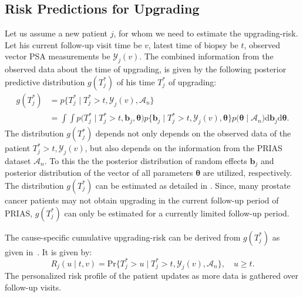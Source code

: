 \begin{subappendices}
\section{Risk Predictions for Upgrading}
\label{c5:appendix:validation_res}
Let us assume a new patient $j$, for whom we need to estimate the upgrading-risk. Let his current follow-up visit time be $v$, latest time of biopsy be $t$, observed vector PSA measurements be $\mathcal{Y}_{j}(v)$. The combined information from the observed data about the time of upgrading, is given by the following posterior predictive distribution $g(T^*_j)$ of his time $T^*_j$ of upgrading:
\begin{equation*}
\label{c5:eq:post_pred_dist}
\begin{aligned}
g(T^*_j) &= p\big\{T^*_j \mid T^*_j > t, \mathcal{Y}_{j}(v), \mathcal{A}_n\big\}\\
&= \int \int p\big(T^*_j \mid T^*_j > t, \boldsymbol{b}_j, \boldsymbol{\theta}\big) p\big\{\boldsymbol{b}_j \mid T^*_j>t, \mathcal{Y}_{j}(v), \boldsymbol{\theta}\big\}p\big(\boldsymbol{\theta} \mid \mathcal{A}_n\big) \mathrm{d} \boldsymbol{b}_j \mathrm{d} \boldsymbol{\theta}.
\end{aligned}
\end{equation*}
The distribution $g(T^*_j)$ depends not only depends on the observed data of the patient $T^*_j > t, \mathcal{Y}_{j}(v)$, but also depends on the information from the PRIAS dataset $\mathcal{A}_n$. To this the the posterior distribution of random effects $\boldsymbol{b}_j$ and posterior distribution of the vector of all parameters $\boldsymbol{\theta}$ are utilized, respectively. The distribution $g(T^*_j)$ can be estimated as detailed in \citet{rizopoulos2017dynamic}. Since, many prostate cancer patients may not obtain upgrading in the current follow-up period of PRIAS, $g(T^*_j)$ can only be estimated for a currently limited follow-up period.

The cause-specific cumulative upgrading-risk can be derived from $g(T^*_j)$ as given in~\citep{rizopoulos2017dynamic}. It is given by:
\begin{equation}
\label{c5:eq:dynamic_risk_prob}
R_j(u \mid t, v) = \mbox{Pr}\big\{T^*_j > u \mid T^*_j > t, \mathcal{Y}_{j}(v), \mathcal{A}_n\big\}, \quad u \geq t.
\end{equation}
The personalized risk profile of the patient updates as more data is gathered over follow-up visits. 


\end{subappendices}
